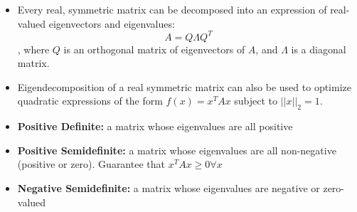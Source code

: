 \begin{itemize}
    \item Every real, symmetric matrix can be decomposed into an expression of real-valued eigenvectors and eigenvalues:
    $$ A = Q \Lambda Q^T$$,
    where $Q$ is an orthogonal matrix of eigenvectors of $A$, and $\Lambda$ is a diagonal matrix.
    \item Eigendecomposition of a real symmetric matrix can also be used to optimize quadratic expressions of the form $f(x) = x^T Ax $ subject to $||x||_2 = 1$.
    \item \textbf{Positive Definite:} a matrix whose eigenvalues are all positive
    \item \textbf{Positive Semidefinite:} a matrix whose eigenvalues are all non-negative (positive or zero). Guarantee that $x^T Ax \geq 0 \forall x$
    \item \textbf{Negative Semidefinite:} a matrix whose eigenvalues are negative or zero-valued
\end{itemize}

